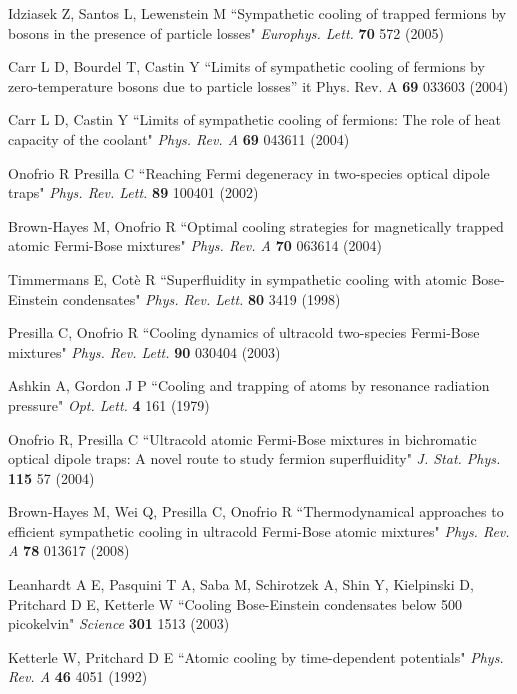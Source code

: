 \documentclass[pra,letterpaper,twocolumn,showpacs,superscriptaddress]{revtex4}
\begin{document}
\begin{thebibliography}{300}
 Idziasek Z, Santos L, Lewenstein M
``Sympathetic cooling of trapped fermions by bosons in the presence of particle losses"
{\it Europhys. Lett.} \textbf{70} 572 (2005)

 Carr L D, Bourdel T, Castin Y
``Limits of sympathetic cooling of fermions by zero-temperature bosons due to particle losses''
{it Phys. Rev. A} \textbf{69} 033603 (2004)

 Carr L D, Castin Y
``Limits of sympathetic cooling of fermions: The role of heat capacity of the coolant"
{\it Phys. Rev. A} \textbf{69} 043611 (2004)

 Onofrio R Presilla C ``Reaching Fermi degeneracy in two-species optical dipole traps"
{\it Phys. Rev. Lett.} \textbf{89} 100401 (2002)

 Brown-Hayes M, Onofrio R
``Optimal cooling strategies for magnetically trapped atomic Fermi-Bose mixtures"  {\it Phys. Rev. A} \textbf{70} 063614 (2004)

 Timmermans E, Cot\`e R
``Superfluidity in sympathetic cooling with atomic Bose-Einstein condensates"
{\it Phys. Rev. Lett.} \textbf{80} 3419 (1998)

 Presilla C, Onofrio R
``Cooling dynamics of ultracold two-species Fermi-Bose mixtures" {\it Phys. Rev. Lett.} \textbf{90} 030404 (2003)

 Ashkin A, Gordon J P
``Cooling and trapping of atoms by resonance radiation pressure" {\it Opt. Lett.} \textbf{4} 161 (1979)

 Onofrio R, Presilla C 
``Ultracold atomic Fermi-Bose mixtures in bichromatic optical dipole traps: A novel route to study fermion superfluidity"
{\it  J. Stat. Phys.} \textbf{115} 57 (2004)

 Brown-Hayes M, Wei Q, Presilla C, Onofrio R
``Thermodynamical approaches to efficient sympathetic cooling in ultracold Fermi-Bose atomic mixtures"
{\it Phys. Rev. A} \textbf{78} 013617 (2008)

 Leanhardt A E, Pasquini T A, Saba M, Schirotzek A, Shin Y, Kielpinski D, Pritchard D E, Ketterle W
``Cooling Bose-Einstein condensates below 500 picokelvin" {\it Science} \textbf{301} 1513 (2003)

 Ketterle W, Pritchard D E ``Atomic cooling by time-dependent potentials"
{\it Phys. Rev. A} \textbf{46} 4051 (1992)


\end{thebibliography}
\end{document}

